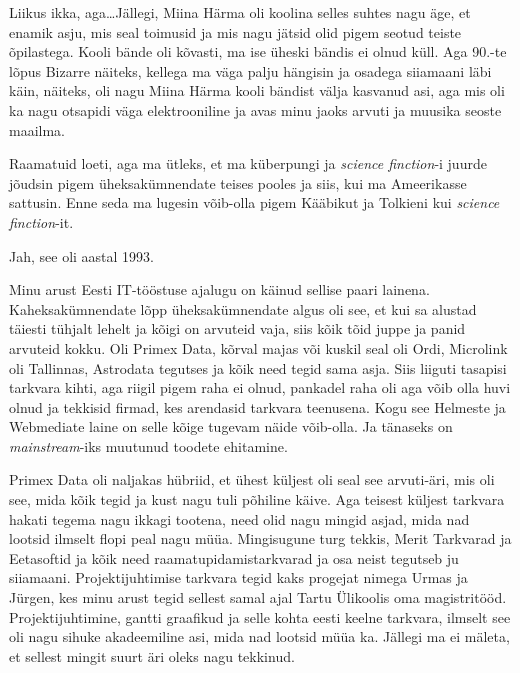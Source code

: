 Liikus ikka, aga\ldots Jällegi, Miina Härma oli koolina  selles suhtes nagu äge, et enamik asju, mis seal toimusid ja mis nagu jätsid olid pigem seotud teiste õpilastega. Kooli bände oli kõvasti, ma ise üheski bändis ei olnud küll. Aga 90.-te lõpus Bizarre näiteks, kellega ma väga palju hängisin ja osadega siiamaani läbi käin, näiteks, oli nagu Miina Härma kooli bändist välja kasvanud asi, aga mis oli ka nagu otsapidi väga elektrooniline ja avas minu jaoks arvuti ja muusika seoste maailma. 

Raamatuid loeti, aga  ma ütleks, et ma küberpungi ja \emph{science finction}-i juurde jõudsin pigem üheksakümnendate teises pooles ja siis, kui ma Ameerikasse sattusin. Enne seda ma lugesin võib-olla  pigem Kääbikut ja Tolkieni kui \emph{science finction}-it.


Jah, see oli aastal 1993.


Minu arust Eesti IT-tööstuse ajalugu on käinud sellise paari lainena. Kaheksakümnendate lõpp üheksakümnendate algus oli see, et kui sa alustad täiesti tühjalt lehelt ja kõigi on arvuteid vaja, siis kõik tõid juppe ja panid arvuteid kokku. Oli Primex Data, kõrval majas või kuskil seal oli Ordi, Microlink oli Tallinnas, Astrodata tegutses ja kõik need tegid sama asja. Siis liiguti tasapisi tarkvara kihti, aga riigil pigem raha ei olnud,  pankadel raha oli aga võib olla huvi olnud ja tekkisid firmad, kes arendasid tarkvara teenusena. Kogu see Helmeste ja Webmediate laine on selle kõige tugevam näide võib-olla. Ja  tänaseks on \emph{mainstream}-iks  muutunud  toodete ehitamine. 

Primex Data oli naljakas hübriid,  et ühest küljest oli seal see arvuti-äri, mis oli see, mida kõik tegid ja kust nagu tuli põhiline käive. Aga teisest küljest tarkvara hakati tegema nagu ikkagi tootena, need olid nagu mingid asjad, mida nad lootsid ilmselt flopi peal nagu müüa. Mingisugune turg tekkis, Merit Tarkvarad ja Eetasoftid ja kõik need raamatupidamistarkvarad ja osa neist tegutseb ju siiamaani. Projektijuhtimise tarkvara tegid kaks progejat nimega Urmas ja Jürgen, kes  minu arust tegid sellest samal ajal Tartu Ülikoolis oma magistritööd. Projektijuhtimine, gantti graafikud ja selle kohta eesti keelne tarkvara, ilmselt see oli nagu sihuke akadeemiline asi, mida nad lootsid müüa ka. Jällegi ma ei mäleta, et sellest mingit suurt äri oleks nagu tekkinud. 

